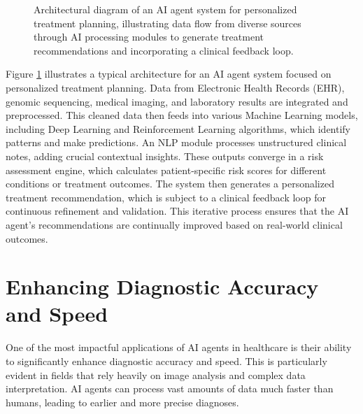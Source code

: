 \documentclass[12pt,a4paper]{article}
\begin{document}
\begin{figure}[H]
  \caption{Architectural diagram of an AI agent system for personalized treatment planning, illustrating data flow from diverse sources through AI processing modules to generate treatment recommendations and incorporating a clinical feedback loop.}
  \label{fig:architecture}
\end{figure}

Figure \ref{fig:architecture} illustrates a typical architecture for an AI agent system focused on personalized treatment planning. Data from Electronic Health Records (EHR), genomic sequencing, medical imaging, and laboratory results are integrated and preprocessed. This cleaned data then feeds into various Machine Learning models, including Deep Learning and Reinforcement Learning algorithms, which identify patterns and make predictions. An NLP module processes unstructured clinical notes, adding crucial contextual insights. These outputs converge in a risk assessment engine, which calculates patient-specific risk scores for different conditions or treatment outcomes. The system then generates a personalized treatment recommendation, which is subject to a clinical feedback loop for continuous refinement and validation. This iterative process ensures that the AI agent's recommendations are continually improved based on real-world clinical outcomes.

\section{Enhancing Diagnostic Accuracy and Speed}
\label{sec:diagnostic_accuracy}
One of the most impactful applications of AI agents in healthcare is their ability to significantly enhance diagnostic accuracy and speed. This is particularly evident in fields that rely heavily on image analysis and complex data interpretation. AI agents can process vast amounts of data much faster than humans, leading to earlier and more precise diagnoses.
\end{document}
